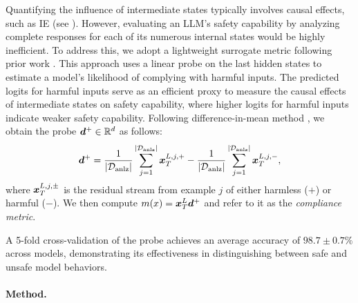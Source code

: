 Quantifying the influence of intermediate states typically involves causal effects, such as IE (see ).
However, evaluating an LLM's safety capability by analyzing complete responses for each of its numerous internal states would be highly inefficient.
To address this, we adopt a lightweight surrogate metric following prior work \cite{lee2024mechanistic, arditi2024refusal}. This approach uses a linear probe on the last hidden states to estimate a model's likelihood of complying with harmful inputs.
The predicted logits for harmful inputs serve as an efficient proxy to measure the causal effects of intermediate states on safety capability, where higher logits for harmful inputs indicate weaker safety capability. Following difference-in-mean method \cite{arditi2024refusal, marks2024geometry}, we obtain the probe \({\bm{d}}^{+}\in {\mathbb{R}}^d\) as follows:
\vspace{-0.6em}
\begin{equation}
    {\bm{d}}^+ = \frac{1}{|{\mathcal{D}}_{\text{anlz}}|}\sum_{j=1}^{|{\mathcal{D}}_{\text{anlz}}|} {\bm{x}}^{L,j,+}_{T} - \frac{1}{|{\mathcal{D}}_{\text{anlz}}|}\sum_{j=1}^{|{\mathcal{D}}_{\text{anlz}}|} {\bm{x}}^{L,j,-}_{T},
\label{eq:diff_prob}
\end{equation}
where \( {\bm{x}}^{L,j,\pm}_{T} \) is the residual stream from example \(j\) of either harmless (\(+\)) or harmful (\(-\)).  We then compute \(m(x) = {\bm{x}}_{T}^{L} {\bm{d}}^+\) and refer to it as the \textit{compliance metric}. 

A 5-fold cross-validation of the probe achieves an average accuracy of $98.7 \pm 0.7\%$ across models, demonstrating its effectiveness in distinguishing between safe and unsafe model behaviors.

\paragraph{Method.}

